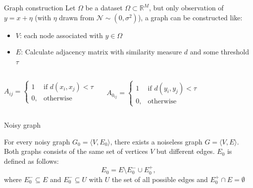 \documentclass[aspectratio=169]{beamer}
\begin{document}
\begin{frame}{Graph construction}
    Let $\Omega$ be a dataset $\Omega \subset \mathbb{R}^M$, but only observation 
    of $y = x + \eta$ (with $\eta$ drawn from $\mathcal{N} \sim (0, \sigma^2)$), 
    a graph can be constructed like:
    \begin{itemize}
        \item $V$: each node associated with $y \in \Omega$
        \item $E$: Calculate adjacency matrix with similarity measure $d$ and some threshold $\tau$
     \end{itemize}

    \begin{columns}
            \begin{definition}
                \begin{equation}
                    \label{eq:graphConstruction}
                    A_{ij} =    
                    \begin{cases}
                        1  & \text{if } d(x_i, x_j) < \tau\\
                        0, & \text{otherwise}
                    \end{cases}
                \end{equation}
            \end{definition}
            \begin{definition}
                \begin{equation}
                    \label{eq:graphConstructionNoise}
                    A_{0_{ij}} =    
                    \begin{cases}
                        1  & \text{if } d(y_i, y_j) < \tau\\
                        0, & \text{otherwise}
                    \end{cases}
                \end{equation}
                
            \end{definition}
    \end{columns}
\end{frame}

\begin{frame}[c]{Noisy graph}

    \begin{theorem}
        For every noisy graph $G_0 = \langle V, E_0 \rangle$, 
        there exists a noiseless graph $G = \langle V, E \rangle$.
        Both graphs consists of the same set of vertices $V$ but different edges.
        $E_0$  is defined as follows:
        $$E_0 = E \setminus  E^{-}_0 \cup  E^{+}_0,$$
        where $E^{-}_0 \subseteq E$ and $E^{-}_0 \subseteq U$ with $U$ the set of all possible edges and $E^{+}_0 \cap E = \emptyset$
    \end{theorem}

\end{frame}
\end{document}
